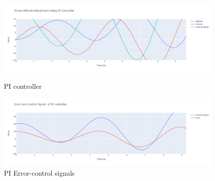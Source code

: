 \documentclass[a4paper,12pt]{article}
\begin{document}
\begin{figure}
    \centering
    \includegraphics[width=1\linewidth,height=0.6
    \linewidth]{photos/pi.png}
    \caption{PI controller}
    \label{fig:enter-label}
    \centering
    \includegraphics[width=1\linewidth,height=0.6
    \linewidth]{photos/pi_error.png}
    \caption{PI Error-control signals}
    \label{fig:enter-label}
    
\end{figure}
\end{document}

